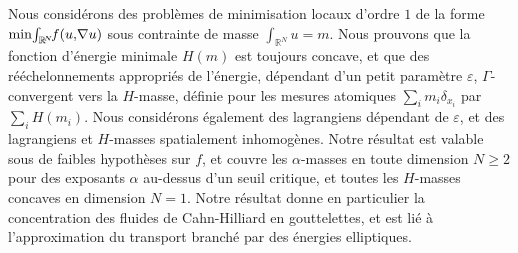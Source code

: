 \documentclass[JEP,XML,SOM,Unicode,published]{cedram}
\theoremstyle{plain}
\theoremstyle{definition}
\begin{document}
\begin{altabstract}
Nous considérons des problèmes de minimisation locaux d'ordre $1$ de la forme $\min\mkern-3mu \int_{\mathbb{R}\!^N}\!\!f(u,\!\nabla u)$ sous contrainte de masse $\int_{\mathbb{R}^N}u=m$. Nous prouvons que la fonction d'énergie minimale $H(m)$ est toujours concave, et que des rééchelonnements appropriés de l'énergie, dépendant d'un petit paramètre $\varepsilon$, $\Gamma$-convergent vers la $H$-masse, définie pour les mesures atomiques $\sum_i m_i\delta_{x_i}$ par $\sum_i H(m_i)$. Nous considérons également des lagrangiens dépendant de $\varepsilon$, et des lagrangiens et $H$-masses spatialement inhomogènes. Notre résultat est valable sous de faibles hypothèses sur $f$, et couvre les $\alpha$-masses en toute dimension $N\geq 2$ pour des exposants $\alpha$ au-dessus d'un seuil critique, et toutes les $H$-masses concaves en dimension $N=1$. Notre résultat donne en particulier la concentration des fluides de Cahn-Hilliard en gouttelettes, et est lié à l'approximation du transport branché par des énergies elliptiques.\end{altabstract}

\maketitle
\vspace*{-2\baselineskip}
\tableofcontents
\end{document}

